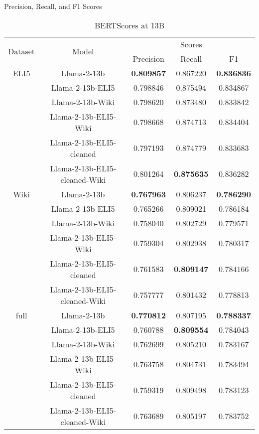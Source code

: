 \documentclass[11pt, oneside]{article}   	%
\begin{document}
\begin{table}[h!]
\centering
\caption{Precision, Recall, and F1 Scores}
\label{tab:scores}
\begin{tabular}{ccccc}
\toprule
\multirow{2}{*}{Dataset} & \multirow{2}{*}{Model} & \multicolumn{3}{c}{Scores} \\
& & Precision & Recall & F1 \\
\midrule
ELI5 & Llama-2-13b & \textbf{0.809857} & 0.867220 & \textbf{0.836836} \\
 & Llama-2-13b-ELI5 & 0.798846 & 0.875494 & 0.834867 \\
 & Llama-2-13b-Wiki & 0.798620 & 0.873480 & 0.833842 \\
  & Llama-2-13b-ELI5-Wiki & 0.798668 & 0.874713 & 0.834404 \\
 & Llama-2-13b-ELI5-cleaned & 0.797193 & 0.874779 & 0.833683 \\
 & Llama-2-13b-ELI5-cleaned-Wiki & 0.801264 & \textbf{0.875635} & 0.836282 \\
 \midrule
Wiki & Llama-2-13b & \textbf{0.767963} & 0.806237 & \textbf{0.786290} \\
 & Llama-2-13b-ELI5 & 0.765266 & 0.809021 & 0.786184 \\
 & Llama-2-13b-Wiki & 0.758040 & 0.802729 & 0.779571 \\
  & Llama-2-13b-ELI5-Wiki & 0.759304 & 0.802938 & 0.780317 \\
 & Llama-2-13b-ELI5-cleaned & 0.761583 & \textbf{0.809147} & 0.784166 \\
 & Llama-2-13b-ELI5-cleaned-Wiki & 0.757777 & 0.801432 & 0.778813 \\
\midrule
full & Llama-2-13b & \textbf{0.770812} & 0.807195 & \textbf{0.788337} \\
 & Llama-2-13b-ELI5 & 0.760788 & \textbf{0.809554} & 0.784043 \\
 & Llama-2-13b-Wiki & 0.762699 & 0.805210 & 0.783167 \\
  & Llama-2-13b-ELI5-Wiki & 0.763758 & 0.804731 & 0.783494 \\
 & Llama-2-13b-ELI5-cleaned & 0.759319 & 0.809498 & 0.783123 \\
 & Llama-2-13b-ELI5-cleaned-Wiki & 0.763689 & 0.805197 & 0.783752 \\
\bottomrule
\end{tabular}
\caption{BERTScores at 13B}
\label{tab:bertscores_13B}
\end{table}
\end{document}
